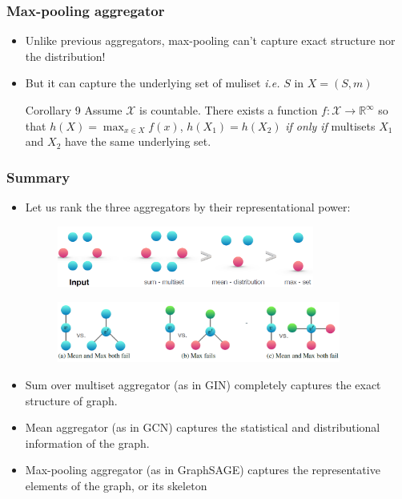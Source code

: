 \documentclass[handout]{beamer}
\begin{document}
\begin{frame}
\frametitle{Max-pooling aggregator}

\begin{itemize}
	\item Unlike previous aggregators, max-pooling can't capture exact structure nor the distribution! \pause
	
	\item But it can capture the \alert{underlying set of muliset} {\it i.e.} $S$ in $X = (S, m)$ \pause

\begin{block}{Corollary 9}
Assume $\mathcal{X}$ is countable.
There exists a function $f : \mathcal{X} \rightarrow \mathbb{R}^\infty$ so that $h(X) = \max_{x \in X} f(x)$, $h(X_1) = h(X_2)$ {\it if only if} multisets $X_1$ and $X_2$ have the same underlying set.

\end{block}

\end{itemize}
\end{frame}

\begin{frame}
\frametitle{Summary}

\begin{itemize}
	\item Let us rank the three aggregators by their representational power: \pause

\begin{figure}[hbt]
  \includegraphics[height=2cm]{fig3.png}
\end{figure} \pause

\begin{figure}[hbt]
  \includegraphics[height=2cm]{fig4.png}
\end{figure}

	\item Sum over multiset aggregator (as in GIN) completely captures the exact structure of graph. \pause
		
	\item Mean aggregator (as in GCN) captures the statistical and distributional information of the graph. \pause
	
	\item Max-pooling aggregator (as in GraphSAGE) captures the representative elements of the graph, or its skeleton
\end{itemize}


\end{frame}
\end{document}

